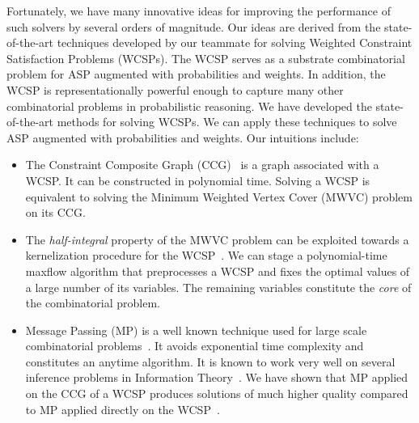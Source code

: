Fortunately, we have many innovative ideas for improving the performance of such solvers by several orders of magnitude. Our ideas are derived from the state-of-the-art techniques developed by our teammate for solving Weighted Constraint Satisfaction Problems (WCSPs). 
The WCSP serves as a substrate combinatorial problem for ASP augmented with probabilities and weights. In addition, the WCSP is representationally powerful enough to capture many other combinatorial problems in probabilistic reasoning. We have developed the state-of-the-art methods for solving WCSPs. We can apply these techniques to solve ASP augmented with probabilities and weights. Our intuitions include:
\begin{itemize}
\item The Constraint Composite Graph (CCG)~\cite{k08,k08a,k16} is a graph associated with a WCSP. It can be constructed in polynomial time.  Solving a WCSP is equivalent to solving the Minimum Weighted Vertex Cover (MWVC) problem on its CCG. 
\item The {\em half-integral\/} property of the MWVC problem can be exploited towards a kernelization procedure for the WCSP~\cite{cc08}. We can stage a polynomial-time maxflow algorithm that preprocesses a WCSP and fixes the optimal values of a large number of its variables. The remaining variables constitute the {\em core\/} of the combinatorial problem. 
\item Message Passing (MP) is a well known technique used for large scale combinatorial problems~\cite{kf09}. It avoids exponential time complexity and constitutes an anytime algorithm.  It is known to work very well on several inference problems in Information Theory~\cite{yfw03}.
We have shown that MP applied on the CCG of a WCSP produces solutions of much higher quality compared to MP applied directly on the WCSP~\cite{xu2017}.
\end{itemize}

